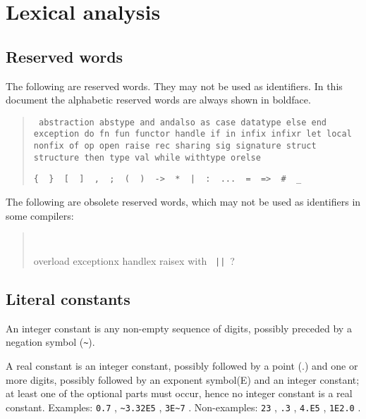 \chapter{Lexical analysis}
\section{Reserved words}
The following are reserved words.   They may not be used as
identifiers.  In this document the alphabetic reserved words are always
shown in boldface.
\begin{quote}
\raggedright
\tt
abstraction abstype and andalso
as case datatype else end exception do fn fun functor handle if in 
infix infixr let local nonfix of op open raise rec sharing sig signature
struct structure then type val while withtype orelse

\verb"{  }  [  ]  ,  ;  (  )  ->  *  |  :  ...  =  =>  #  _"
\end{quote}
The following are obsolete reserved words, which may not be used as
identifiers in some compilers:
\begin{quote}
\tt
\raggedright
overload exceptionx handlex raisex with \ \verb"||"\   ?
\end{quote}
\section{Literal constants}
An integer constant is any non-empty sequence of digits, possibly preceded
by a negation symbol (\verb|~|).

A real constant is an integer constant, possibly followed by a point (.)
and one or more digits, possibly followed by an exponent symbol(E) and
an integer constant; at least one of the optional parts must occur,
hence no integer constant is a real constant.  Examples: \verb|0.7| ,
\verb|~3.32E5| , \verb|3E~7| .  Non-examples: \verb|23| , \verb|.3| ,
\verb|4.E5| , \verb|1E2.0| .

